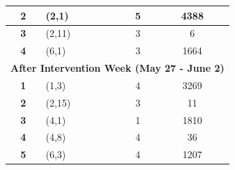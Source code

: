 \begin{table}[]
\begin{tabular}{clcc}
\textbf{2}             & (2,1)             & 5                                                                           & 4388                                                                                    \\ \hline
\textbf{3}             & (2,11)            & 3                                                                           & 6                                                                                       \\ \hline
\textbf{4}             & (6,1)             & 3                                                                           & 1664                                                                                    \\ \hline
\multicolumn{4}{c}{\cellcolor[HTML]{ECF4FF}\textbf{After Intervention Week (May 27 - June 2)}}                                                                                                                     \\ \hline
\textbf{1}             & (1,3)             & 4                                                                           & 3269                                                                                    \\ \hline
\textbf{2}             & (2,15)            & 3                                                                           & 11                                                                                      \\ \hline
\textbf{3}             & (4,1)             & 1                                                                           & 1810                                                                                    \\ \hline
\textbf{4}             & (4,8)             & 4                                                                           & 36                                                                                      \\ \hline
\textbf{5}             & (6,3)             & 4                                                                           & 1207                                                                                    \\ \hline\midrule
\end{tabular}
\end{table}


